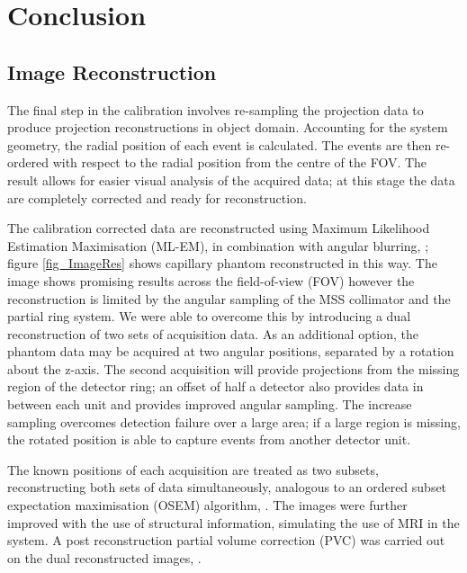 \section{Conclusion}


 
\subsection{Image Reconstruction}
The final step in the calibration involves re-sampling the projection data to produce projection reconstructions in object domain. Accounting for the system geometry, the radial position of each event is calculated. The events are then re-ordered with respect to the radial position from the centre of the FOV. The result allows for easier visual analysis of the acquired data; at this stage the data are completely corrected and ready for reconstruction. 


The calibration corrected data are reconstructed using Maximum Likelihood Estimation Maximisation (ML-EM), \cite{4307558} in combination with angular blurring, \cite{bousse2013angular}; figure \ref{fig_ImageRes} shows capillary phantom reconstructed in this way. The image shows promising results across the field-of-view (FOV) however the reconstruction is limited by the angular sampling of the MSS collimator and the partial ring system. We were able to overcome this by introducing a dual reconstruction of two sets of acquisition data. As an additional option, the phantom data may be acquired at two angular positions, separated by a rotation about the z-axis. The second acquisition will provide projections from the missing region of the detector ring; an offset of half a detector also provides data in between each unit and provides improved angular sampling. The increase sampling overcomes detection failure over a large area; if a large region is missing, the rotated position is able to capture events from another detector unit. 

The known positions of each acquisition are treated as two subsets, reconstructing both sets of data simultaneously, analogous to an ordered subset expectation maximisation (OSEM) algorithm, \cite{363108}. The images were further improved with the use of structural information, simulating the use of MRI in the system. A post reconstruction partial volume correction (PVC) was carried out on the dual reconstructed images, \cite{Erlandsson_2012}.



